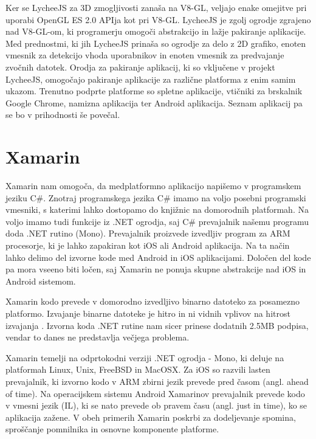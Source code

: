 Ker se LycheeJS za 3D zmogljivosti zanaša na V8-GL, veljajo enake omejitve pri uporabi OpenGL ES 2.0 APIja kot pri V8-GL. LycheeJS je zgolj ogrodje zgrajeno nad V8-GL-om, ki programerju omogoči abstrakcijo in lažje pakiranje aplikacije. Med prednostmi, ki jih LycheeJS prinaša so ogrodje za delo z 2D grafiko, enoten vmesnik za detekcijo vhoda uporabnikov in enoten vmesnik za predvajanje zvočnih datotek. Orodja za pakiranje aplikacij, ki so vključene v projekt LycheeJS, omogočajo pakiranje aplikacije za različne platforma z enim samim ukazom. Trenutno podprte platforme so spletne aplikacije, vtičniki za brskalnik Google Chrome, namizna aplikacija ter Android aplikacija. Seznam aplikacij pa se bo v prihodnosti še povečal.

\section{Xamarin}
\label{sec:xamarin}

Xamarin nam omogoča, da medplatformno aplikacijo napišemo v programskem jeziku C\#. Znotraj programskega jezika C\# imamo na voljo posebni programski vmesniki, s katerimi lahko dostopamo do knjižnic na domorodnih platformah. Na voljo imamo tudi funkcije iz .NET ogrodja, saj C\# prevajalnik našemu programu doda .NET rutino (Mono). Prevajalnik proizvede izvedljiv program za ARM procesorje, ki je lahko zapakiran kot iOS ali Android aplikacija. Na ta način lahko delimo del izvorne kode med Android in iOS aplikacijami. Določen del kode pa mora vseeno biti ločen, saj Xamarin ne ponuja skupne abstrakcije nad iOS in Android sistemom. 

Xamarin kodo prevede v domorodno izvedljivo binarno datoteko za posamezno platformo. Izvajanje binarne datoteke je hitro in ni vidnih vplivov na hitrost izvajanja \cite{xamarin}. Izvorna koda .NET rutine nam sicer prinese dodatnih 2.5MB podpisa, vendar to danes ne predstavlja večjega problema.

Xamarin temelji na odprtokodni verziji .NET ogrodja - Mono, ki deluje na platformah Linux, Unix, FreeBSD in MacOSX. Za iOS so razvili lasten prevajalnik, ki izvorno kodo v ARM zbirni jezik prevede pred časom (angl. ahead of time). Na operacijskem sistemu Android Xamarinov prevajalnik prevede kodo v vmesni jezik (IL), ki se nato prevede ob pravem času (angl. just in time), ko se aplikacija zažene. V obeh primerih Xamarin poskrbi za dodeljevanje spomina, sproščanje pomnilnika in osnovne komponente platforme. %

